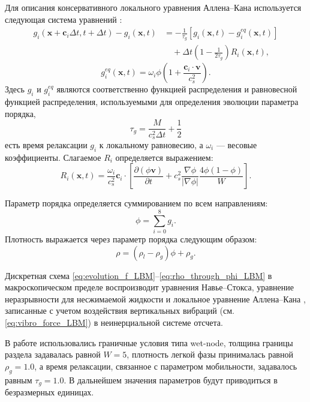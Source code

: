 \documentclass[12pt,a4paper]{article}
\begin{document}
Для описания консервативного локального уравнения Аллена--Кана используется следующая система уравнений \cite{Geier2015, Liang2018}:
\begin{equation}
	\begin{split}
		g_i(\mathbf{x}+\mathbf{c}_i \Delta t, t+\Delta t)
		-g_i(\mathbf{x},t)
		&=
		-\frac{1}{\tau_g}
		\left[
		g_i(\mathbf{x},t)-g_i^{eq}(\mathbf{x},t)
		\right] \\
		&\quad+
		\Delta t
		\left(
		1-\frac{1}{2\tau_g}
		\right)
		R_i(\mathbf{x},t),
	\end{split}
\end{equation}
\begin{equation}
	g_i^{eq}(\mathbf{x},t)=
	\omega_i \phi
	\left(
	1+\frac{\mathbf{c}_i\cdot\mathbf{v}}{c_s^2}
	\right).
\end{equation}
Здесь $g_i$ и $g_i^{eq}$ являются соответственно функцией распределения и равновесной функцией распределения, используемыми для определения эволюции параметра порядка,
$$
\tau_g=
\frac{M}{c_s^2 \Delta t}+\frac{1}{2}
$$
есть время релаксации $g_i$ к локальному равновесию, а $\omega_i$ --- весовые коэффициенты.
Слагаемое $R_i$ определяется выражением:
\begin{equation}
	R_i(\mathbf{x},t)=
	\frac{\omega_i}{c_s^2}
	\mathbf{c}_i\cdot
	\left[
	\frac{\partial(\phi \mathbf{v})}{\partial t}
	+
	c_s^2
	\frac{\nabla \phi}{|\nabla \phi|}
	\frac{4\phi(1-\phi)}{W}
	\right].
\end{equation}

Параметр порядка определяется суммированием по всем направлениям:
\begin{equation}
	\phi=\sum_{i=0}^{8} g_i.
\end{equation}
Плотность выражается через параметр порядка следующим образом:
\begin{equation}\label{eq:rho_through_phi_LBM}
	\rho=(\rho_l-\rho_g)\phi+\rho_g.
\end{equation}

Дискретная схема \eqref{eq:evolution_f_LBM}--\eqref{eq:rho_through_phi_LBM} в макроскопическом пределе воспроизводит уравнения Навье--Стокса, уравнение неразрывности для несжимаемой жидкости и локальное уравнение Аллена--Кана \cite{Wang2016, Liang2018}, записанные с учетом воздействия вертикальных вибраций (см. \eqref{eq:vibro_force_LBM}) в неинерциальной системе отсчета.

В работе использовались граничные условия типа wet-node, толщина границы раздела задавалась равной $W=5$, плотность легкой фазы принималась равной $\rho_g=1.0$, а время релаксации, связанное с параметром мобильности, задавалось равным $\tau_g=1.0$. В дальнейшем значения параметров будут приводиться в безразмерных единицах.
\end{document}

